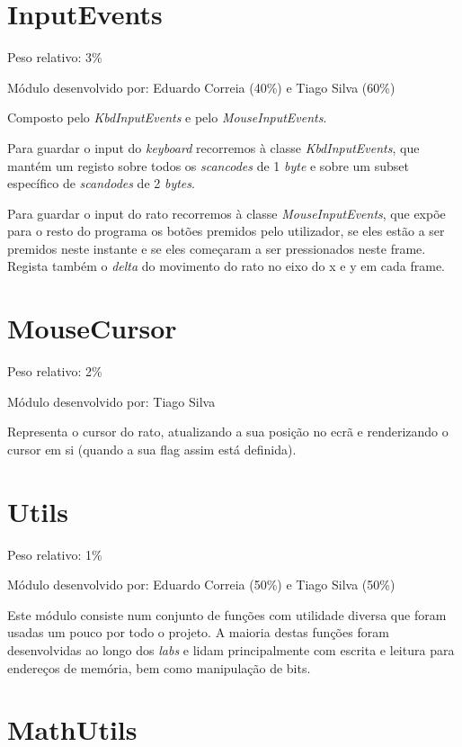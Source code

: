 \documentclass{report}
\begin{document}
\section{InputEvents}

Peso relativo: 3\%

Módulo desenvolvido por: Eduardo Correia (40\%) e Tiago Silva (60\%)

Composto pelo \textit{KbdInputEvents} e pelo \textit{MouseInputEvents}.

Para guardar o input do \textit{keyboard} recorremos à classe \textit{KbdInputEvents}, que mantém um registo sobre todos os \textit{scancodes} de 1 \textit{byte} e sobre um subset específico de \textit{scandodes} de 2 \textit{bytes}.

Para guardar o input do rato recorremos à classe \textit{MouseInputEvents}, que expõe para o resto do programa os botões premidos pelo utilizador, se eles estão a ser premidos neste instante e se eles começaram a ser pressionados neste frame. Regista também o \textit{delta} do movimento do rato no eixo do x e y em cada frame.

\section{MouseCursor}

Peso relativo: 2\%

Módulo desenvolvido por: Tiago Silva

Representa o cursor do rato, atualizando a sua posição no ecrã e renderizando o cursor em si (quando a sua flag assim está definida).\newline

\section{Utils}

Peso relativo: 1\%

Módulo desenvolvido por: Eduardo Correia (50\%) e Tiago Silva (50\%) 
\newline

Este módulo consiste num conjunto de funções com utilidade diversa que foram usadas um pouco por todo o projeto. A maioria destas funções foram desenvolvidas ao longo dos \textit{labs} e lidam principalmente com escrita e leitura para endereços de memória, bem como manipulação de bits.

\section{MathUtils}
\end{document}
